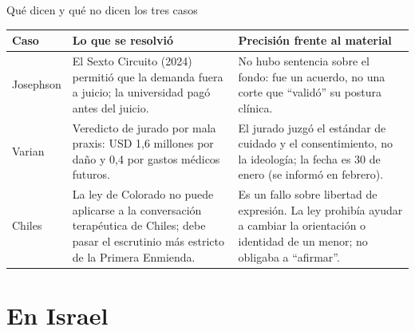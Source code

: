 \begin{frame}{Qué dicen y qué no dicen los tres casos}
\scriptsize\renewcommand{\arraystretch}{1.22}
\begin{tabular}{@{}>{\RaggedRight\arraybackslash}p{2.0cm}>{\RaggedRight\arraybackslash}p{4.9cm}>{\RaggedRight\arraybackslash}p{4.9cm}@{}}
\toprule
\textbf{Caso} & \textbf{Lo que se resolvió} & \textbf{Precisión frente al material} \\ \midrule
Josephson & El Sexto Circuito (2024) permitió que la demanda fuera a juicio; la universidad pagó antes del juicio. & No hubo sentencia sobre el fondo: fue un acuerdo, no una corte que ``validó'' su postura clínica. \\
Varian & Veredicto de jurado por mala praxis: USD 1,6 millones por daño y 0,4 por gastos médicos futuros. & El jurado juzgó el estándar de cuidado y el consentimiento, no la ideología; la fecha es 30 de enero (se informó en febrero). \\
Chiles & La ley de Colorado no puede aplicarse a la conversación terapéutica de Chiles; debe pasar el escrutinio más estricto de la Primera Enmienda. & Es un fallo sobre libertad de expresión. La ley prohibía ayudar a cambiar la orientación o identidad de un menor; no obligaba a ``afirmar''. \\
\bottomrule
\end{tabular}\par\medskip
{}
\end{frame}

\section{En Israel}

